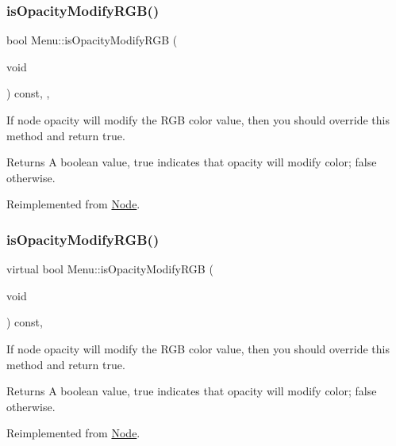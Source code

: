 \subsubsection{\texorpdfstring{is\+Opacity\+Modify\+R\+G\+B()}{isOpacityModifyRGB()}\hspace{0.1cm}{\footnotesize\ttfamily [1/2]}}
{\footnotesize\ttfamily bool Menu\+::is\+Opacity\+Modify\+R\+GB (\begin{DoxyParamCaption}\item[{void}]{ }\end{DoxyParamCaption}) const\hspace{0.3cm}{\ttfamily [inline]}, {\ttfamily [override]}, {\ttfamily [virtual]}}

If node opacity will modify the R\+GB color value, then you should override this method and return true. \begin{DoxyReturn}{Returns}
A boolean value, true indicates that opacity will modify color; false otherwise. 
\end{DoxyReturn}


Reimplemented from \hyperlink{classNode_ae6ce32d2088e2bb3426608334f1091c5}{Node}.

\mbox{\label{classMenu_a94211ecf8dd3edeed2e5d54f63ae90b9}} 
\subsubsection{\texorpdfstring{is\+Opacity\+Modify\+R\+G\+B()}{isOpacityModifyRGB()}\hspace{0.1cm}{\footnotesize\ttfamily [2/2]}}
{\footnotesize\ttfamily virtual bool Menu\+::is\+Opacity\+Modify\+R\+GB (\begin{DoxyParamCaption}\item[{void}]{ }\end{DoxyParamCaption}) const\hspace{0.3cm}{\ttfamily [override]}, {\ttfamily [virtual]}}

If node opacity will modify the R\+GB color value, then you should override this method and return true. \begin{DoxyReturn}{Returns}
A boolean value, true indicates that opacity will modify color; false otherwise. 
\end{DoxyReturn}


Reimplemented from \hyperlink{classNode_ae6ce32d2088e2bb3426608334f1091c5}{Node}.

